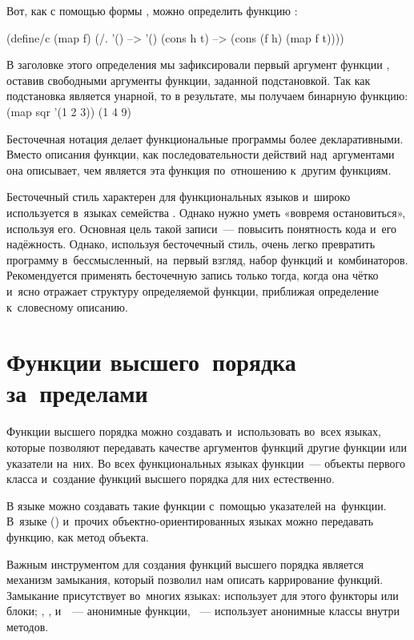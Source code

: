 Вот, как с помощью формы , можно определить функцию :
\begin{SchemeCode}[emph={f,h,t}]
(define/c (map f)
  (/. '() --> '()
      (cons h t) --> (cons (f h) (map f t))))
\end{SchemeCode}
В заголовке этого определения мы зафиксировали первый аргумент функции , оставив свободными аргументы функции, заданной подстановкой. Так как подстановка является унарной, то в результате, мы получаем бинарную функцию:
\REPL
  {(map sqr '(1 2 3))}
  {(1 4 9)} 

Бесточечная нотация делает функциональные программы более декларативными. Вместо описания функции, как последовательности действий над~аргументами она описывает, чем является эта функция по~отношению к~другим функциям.

Бесточечный стиль характерен для функциональных языков и~широко используется в~языках семейства . Однако нужно уметь «вовремя остановиться», используя его. Основная цель такой записи~--- повысить понятность кода и~его надёжность. Однако, используя бесточечный стиль, очень легко превратить программу в~бессмысленный, на~первый взгляд, набор функций и~комбинаторов. Рекомендуется применять бесточечную запись только тогда, когда она чётко и~ясно отражает структуру определяемой функции, приближая определение к~словесному описанию.

\section[4]{Функции высшего~порядка за~пределами~\Scheme}%
Функции высшего порядка можно создавать и~использовать во~всех языках, которые позволяют передавать качестве аргументов функций другие функции или указатели на~них.
Во всех функциональных языках функции~--- объекты первого класса и~создание функций высшего порядка для них естественно.

В языке  можно создавать такие функции с~помощью указателей на~функции. В~языке  () и~прочих объектно-ориентированных языках можно передавать функцию, как метод объекта.

Важным инструментом для создания функций высшего порядка является механизм замыкания, который позволил нам описать каррирование функций. Замыкание присутствует во~многих языках:  использует для этого функторы или блоки; , ,  и~~--- анонимные функции, ~--- использует анонимные классы внутри методов.

